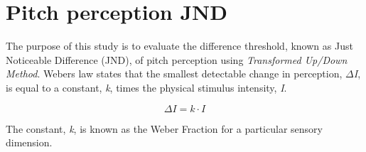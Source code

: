 \chapter*{Pitch perception JND}
The purpose of this study is to evaluate the difference threshold, known as Just Noticeable Difference (JND), of pitch perception using \textit{Transformed Up/Down Method}. Webers law states that the smallest detectable change in perception, $\Delta$\textit{I}, is equal to a constant, \textit{k}, times the physical stimulus intensity, \textit{I}.

\begin{equation}
\Delta I= k \cdot I
\end{equation}

The constant, \textit{k}, is known as the Weber Fraction for a particular sensory dimension.